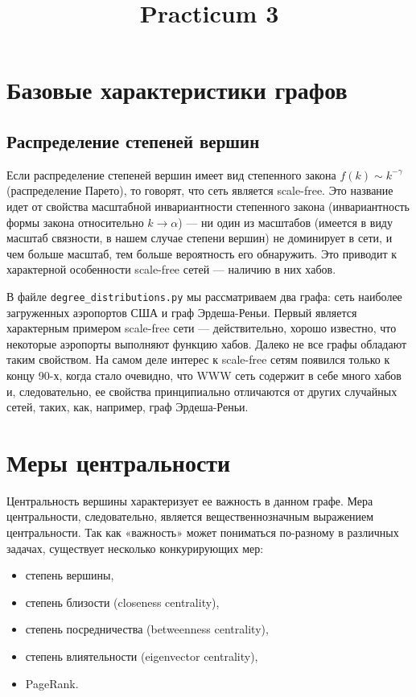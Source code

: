 \documentclass[a4paper,12pt]{article}
\title{Practicum 3}
\begin{document}
\maketitle %

\section{Базовые характеристики графов} %

\subsection{Распределение степеней вершин} %

Если распределение степеней вершин имеет вид степенного закона \( f(k) \sim k^{-\gamma} \) (распределение Парето), то говорят, что сеть является scale-free. Это название идет от свойства масштабной инвариантности степенного закона (инвариантность формы закона относительно \( k \to \alpha \)) --- ни один из масштабов (имеется в виду масштаб связности, в нашем случае степени вершин) не доминирует в сети, и чем больше масштаб, тем больше вероятность его обнаружить. Это приводит к характерной особенности scale-free сетей --- наличию в них хабов.

В файле \texttt{degree\_distributions.py} мы рассматриваем два графа: сеть наиболее загруженных аэропортов США и граф Эрдеша-Реньи. Первый является характерным примером scale-free сети --- действительно, хорошо известно, что некоторые аэропорты выполняют функцию хабов. Далеко не все графы обладают таким свойством. На самом деле интерес к scale-free сетям появился только к концу 90-х, когда стало очевидно, что WWW сеть содержит в себе много хабов и, следовательно, ее свойства принципиально отличаются от других случайных сетей, таких, как, например, граф Эрдеша-Реньи.

\section{Меры центральности}

Центральность вершины характеризует ее важность в данном графе. Мера центральности, следовательно, является вещественнозначным выражением центральности. Так как «важность» может пониматься по-разному в различных задачах, существует несколько конкурирующих мер:
\begin{itemize}
    \item степень вершины,
    \item степень близости (closeness centrality),
    \item степень посредничества (betweenness centrality),
    \item степень влиятельности (eigenvector centrality),
    \item PageRank.
\end{itemize}
\end{document}
